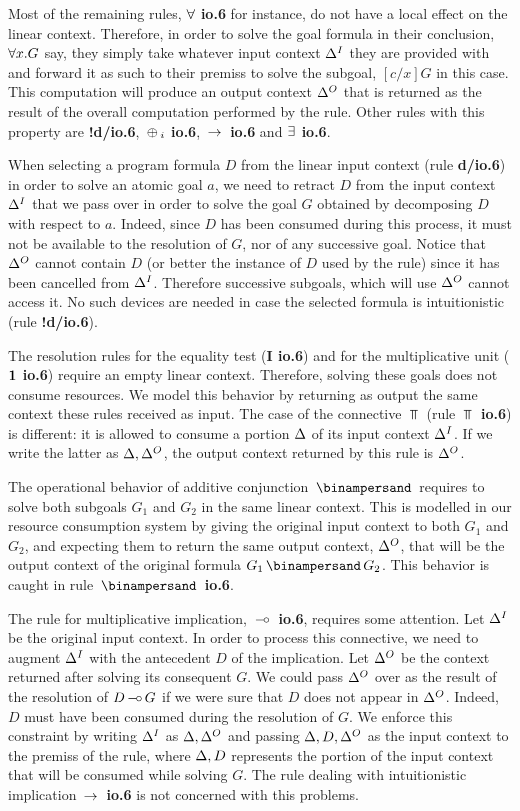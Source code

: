 Most of the remaining rules, {\bf $\forall$ io.6} for instance, do not have a
local effect on the linear context.  Therefore, in order to solve the goal
formula in their conclusion, $\forall x. G$ say, they simply take whatever input
context $\Delta^I$ they are provided with and forward it as such to their premiss
to solve the subgoal, $[c/x]G$ in this case. This computation will produce an
output context $\Delta^O$ that is returned as the result of the overall
computation performed by the rule. Other rules with this property are {\bf
  !d/io.6}, {\bf $\, \oplus \,_i$ io.6}, {\bf $\, \rightarrow \,$ io.6} and {\bf $\exists$ io.6}.

When selecting a program formula $D$ from the linear input context (rule {\bf
  d/io.6}) in order to solve an atomic goal $a$, we need to retract $D$ from
the input context $\Delta^I$ that we pass over in order to solve the goal $G$
obtained by decomposing $D$ with respect to $a$. Indeed, since $D$ has been
consumed during this process, it must not be available to the resolution of
$G$, nor of any successive goal. Notice that $\Delta^O$ cannot contain $D$ (or
better the instance of $D$ used by the rule) since it has been cancelled from
$\Delta^I$. Therefore successive subgoals, which will use $\Delta^O$ cannot access
it. No such devices are needed in case the selected formula is intuitionistic
(rule {\bf !d/io.6}).

The resolution rules for the equality test ({\bf I io.6}) and for the
multiplicative unit ({\bf ${\bf 1}$ io.6}) require an empty linear context.
Therefore, solving these goals does not consume resources. We model this
behavior by returning as output the same context these rules received as
input. The case of the connective $\Top$ (rule {\bf $\Top$ io.6}) is
different: it is allowed to consume a portion $\Delta$ of its input context
$\Delta^I$. If we write the latter as $\Delta,\Delta^O$, the output context returned by
this rule is $\Delta^O$.

The operational behavior of additive conjunction $\With$ requires to solve
both subgoals $G_1$ and $G_2$ in the same linear context. This is modelled in
our resource consumption system by giving the original input context to both
$G_1$ and $G_2$, and expecting them to return the same output context,
$\Delta^O$, that will be the output context of the original formula $G_1 \With
G_2$. This behavior is caught in rule {\bf $\With$ io.6}.

The rule for multiplicative implication, {\bf $\, \mbox{$-\!\circ$} \,$ io.6}, requires some
attention. Let $\Delta^I$ be the original input context. In order to process this
connective, we need to augment $\Delta^I$ with the antecedent $D$ of the
implication. Let $\Delta^O$ be the context returned after solving its consequent
$G$. We could pass $\Delta^O$ over as the result of the resolution of $D \, \mbox{$-\!\circ$} \,
G$ if we were sure that $D$ does not appear in $\Delta^O$. Indeed, $D$ must have
been consumed during the resolution of $G$. We enforce this constraint by
writing $\Delta^I$ as $\Delta,\Delta^O$ and passing $\Delta,D,\Delta^O$ as the input context to
the premiss of the rule, where $\Delta,D$ represents the portion of the input
context that will be consumed while solving $G$. The rule dealing with
intuitionistic implication {\bf $\, \rightarrow \,$ io.6} is not concerned with this
problems.

